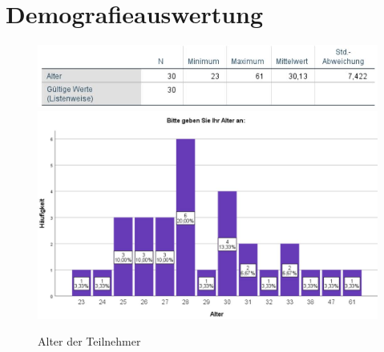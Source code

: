 \documentclass[a4paper,11pt]{article}%
\renewcommand{\\}{\vspace*{0.5\baselineskip} \newline}
\begin{document}
	\section{Demografieauswertung}
	\begin{figure}[H]
		\begin{footnotesize}
			\includegraphics[width=\textwidth]{Abbildungen/Pre_QuestionnaireStatistiks/teilnehmerStatistik}\\
			\includegraphics[width=\textwidth]{Abbildungen/Demographie/alter}\\
			\caption{Alter der Teilnehmer}
			\label{fig:Teilnehmer}
		\end{footnotesize}
	\end{figure}	
	
\end{document}
